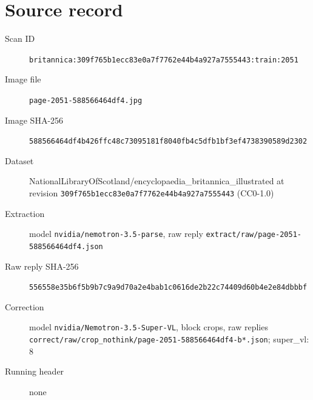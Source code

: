 \documentclass{article}
\begin{document}
\section*{Source record}
\begin{description}
\item[Scan ID] \texttt{britannica:309f765b1ecc83e0a7f7762e44b4a927a7555443:train:2051}
\item[Image file] \texttt{page-2051-588566464df4.jpg}
\item[Image SHA-256] \texttt{588566464df4b426ffc48c73095181f8040fb4c5dfb1bf3ef4738390589d2302}
\item[Dataset] NationalLibraryOfScotland/encyclopaedia\_britannica\_illustrated at revision \texttt{309f765b1ecc83e0a7f7762e44b4a927a7555443} (CC0-1.0)
\item[Extraction] model \texttt{nvidia/nemotron-3.5-parse}, raw reply \texttt{extract/raw/page-2051-588566464df4.json}
\item[Raw reply SHA-256] \texttt{556558e35b6f5b9b7c9a9d70a2e4bab1c0616de2b22c74409d60b4e2e84dbbbf}
\item[Correction] model \texttt{nvidia/Nemotron-3.5-Super-VL}, block crops, raw replies \texttt{correct/raw/crop\_nothink/page-2051-588566464df4-b*.json}; super\_vl: 8
\item[Running header] none
\end{description}
\end{document}
